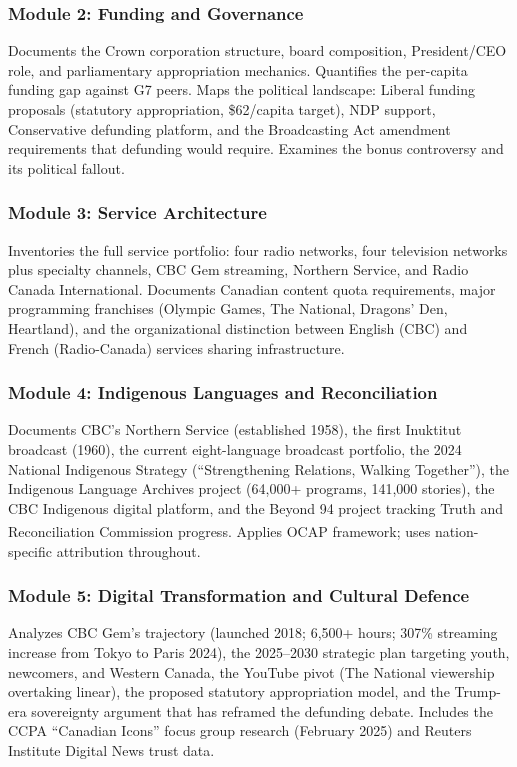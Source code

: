 \documentclass[11pt,letterpaper]{article}
\begin{document}
\subsubsection{Module 2: Funding and Governance}
Documents the Crown corporation structure, board composition, President/CEO role, and parliamentary appropriation mechanics. Quantifies the per-capita funding gap against G7 peers. Maps the political landscape: Liberal funding proposals (statutory appropriation, \$62/capita target), NDP support, Conservative defunding platform, and the Broadcasting Act amendment requirements that defunding would require. Examines the bonus controversy and its political fallout.

\subsubsection{Module 3: Service Architecture}
Inventories the full service portfolio: four radio networks, four television networks plus specialty channels, CBC Gem streaming, Northern Service, and Radio Canada International. Documents Canadian content quota requirements, major programming franchises (Olympic Games, The National, Dragons' Den, Heartland), and the organizational distinction between English (CBC) and French (Radio-Canada) services sharing infrastructure.

\subsubsection{Module 4: Indigenous Languages and Reconciliation}
Documents CBC's Northern Service (established 1958), the first Inuktitut broadcast (1960), the current eight-language broadcast portfolio, the 2024 National Indigenous Strategy (``Strengthening Relations, Walking Together''), the Indigenous Language Archives project (64,000+ programs, 141,000 stories), the CBC Indigenous digital platform, and the Beyond 94 project tracking Truth and Reconciliation Commission progress. Applies OCAP\textsuperscript{\textregistered} framework; uses nation-specific attribution throughout.

\subsubsection{Module 5: Digital Transformation and Cultural Defence}
Analyzes CBC Gem's trajectory (launched 2018; 6,500+ hours; 307\% streaming increase from Tokyo to Paris 2024), the 2025--2030 strategic plan targeting youth, newcomers, and Western Canada, the YouTube pivot (The National viewership overtaking linear), the proposed statutory appropriation model, and the Trump-era sovereignty argument that has reframed the defunding debate. Includes the CCPA ``Canadian Icons'' focus group research (February 2025) and Reuters Institute Digital News trust data.
\end{document}
